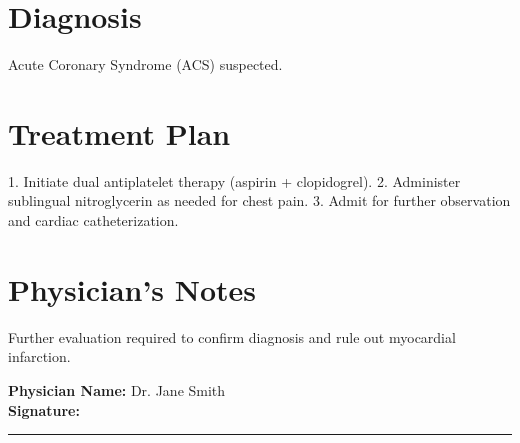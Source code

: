 \documentclass[a4paper,12pt]{article}
\begin{document}
\section*{Diagnosis}
Acute Coronary Syndrome (ACS) suspected.

\section*{Treatment Plan}
1. Initiate dual antiplatelet therapy (aspirin + clopidogrel).  
2. Administer sublingual nitroglycerin as needed for chest pain.  
3. Admit for further observation and cardiac catheterization.  

\section*{Physician's Notes}
Further evaluation required to confirm diagnosis and rule out myocardial infarction.  

\vspace{1cm}

\textbf{Physician Name:} Dr. Jane Smith \\
\textbf{Signature:} \rule{5cm}{0.5pt}
\end{document}

